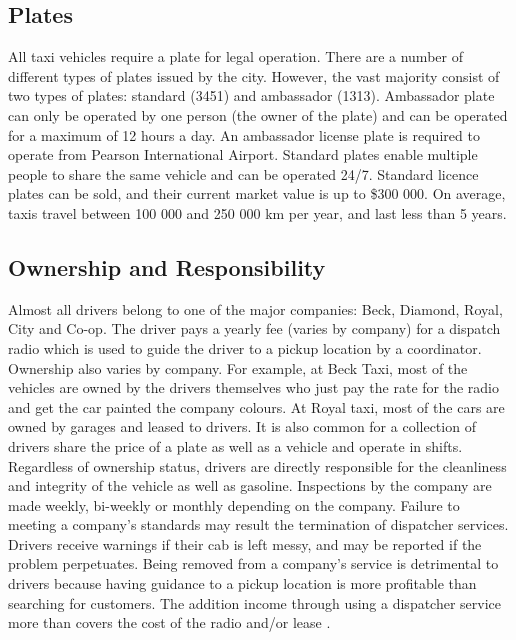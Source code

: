 \documentclass[11pt]{article}
\begin{document}
\subsection{Plates}
All taxi vehicles require a plate for legal operation. There are a number of different types of plates issued by the city. However, the vast majority 
consist of two types of plates: standard (3451) and ambassador (1313)\cite{thestar2012}. 
Ambassador plate can only be operated by one person (the owner of the plate) and can be 
operated for a maximum of 12 hours a day. An ambassador license plate is required to 
operate from Pearson International Airport. Standard plates enable multiple people to share the same vehicle
and can be operated 24/7. Standard licence plates can be sold, and their
current market value is up to \$300 000\cite{thestar2012}. On average, taxis travel between 100 000 and 
250 000 km per year\cite{thestar2012}, and last less than 5 years\cite{thestar2012}. 


\subsection{Ownership and Responsibility}

Almost all drivers belong to one of the major companies: Beck, Diamond, Royal, City and
Co-op. The driver pays a yearly fee (varies by company) for a dispatch radio which is used to guide the 
driver to a pickup location by a coordinator. Ownership also varies by company. For example, 
at Beck Taxi, most of the vehicles are owned by the drivers themselves who just pay the 
rate for the radio and get the car painted the company colours. At Royal taxi, most of the 
cars are owned by garages and leased to drivers. It is also common for a collection of 
drivers share the price of a plate as well as a vehicle and operate in shifts. Regardless of   
ownership status, drivers are directly responsible for the cleanliness and integrity of the vehicle as well as gasoline. 
Inspections by the company are made weekly, bi-weekly or monthly depending on the company. 
Failure to meeting a company's standards may result the termination of dispatcher services. Drivers receive 
warnings if their cab is left messy, and may be reported if the problem perpetuates. Being removed from
a company's service is detrimental to drivers because having guidance to a pickup location
is more profitable than searching for customers. The addition income through using a dispatcher 
service more than covers the cost of the radio and/or lease \cite{thestar2012, Gowder2013}.
\end{document}
